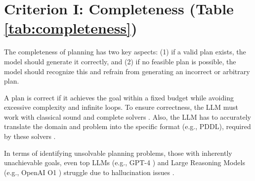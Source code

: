 \section{Criterion I: Completeness (Table \ref{tab:completeness})}\label{sec:completeness}

The completeness of planning has two key aspects: (1) if a valid plan exists, the model should generate it correctly, and (2) if no feasible plan is possible, the model should recognize this and refrain from generating an incorrect or arbitrary plan.

A plan is correct if it achieves the goal within a fixed budget while avoiding excessive complexity and infinite loops. To ensure correctness, the LLM must work with classical sound and complete solvers \cite{guan2023leveraging, hao2024large}. Also, the LLM has to accurately translate the domain and problem into the specific format (e.g., PDDL), required by these solvers \cite{guan2023leveraging}.

In terms of identifying unsolvable planning problems, those with inherently unachievable goals, even top LLMs (e.g., GPT-4 \cite{achiam2023gpt}) and Large Reasoning Models (e.g., OpenAI O1 \cite{jaech2024openai}) struggle due to hallucination issues \cite{aghzal2023can, valmeekam2024llms}. 
